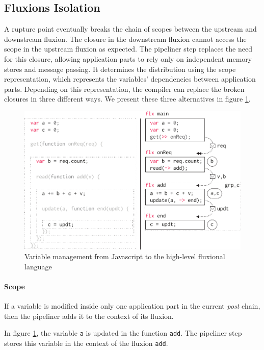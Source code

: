 \subsection{Fluxions Isolation} \label{chapter5:flx:isolation}

A rupture point eventually breaks the chain of scopes between the upstream and downstream fluxion.
The closure in the downstream fluxion cannot access the scope in the upstream fluxion as expected.
The pipeliner step replaces the need for this closure, allowing application parts to rely only on independent memory stores and message passing.
It determines the distribution using the scope representation, which represents the variables' dependencies between application parts.
Depending on this representation, the compiler can replace the broken closures in three different ways.
We present these three alternatives in figure \ref{fig:states}.

\begin{figure}[h!]
  \includegraphics[width=\linewidth]{../resources/states.pdf}
  \caption{Variable management from Javascript to the high-level fluxional language}
  \label{fig:states}
\end{figure}

\paragraph{Scope}
If a variable is modified inside only one application part in the current \textit{post} chain, then the pipeliner adds it to the context of its fluxion.

In figure \ref{fig:states}, the variable \texttt{a} is updated in the function \texttt{add}.
The pipeliner step stores this variable in the context of the fluxion \texttt{add}.

